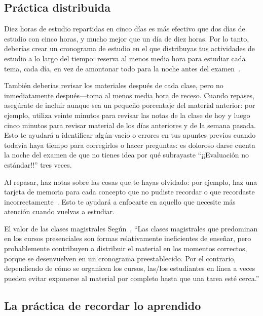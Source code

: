 \subsection*{Práctica distribuida}

Diez horas de estudio repartidas en cinco días
es más efectivo que dos días de estudio con cinco horas,
y mucho mejor que un día de diez horas.
Por lo tanto, deberías crear un cronograma de estudio en el que distribuyas tus actividades de estudio a lo largo del tiempo:
reserva al menos media hora para estudiar cada tema, cada día,
en vez de amontonar todo para la noche antes del examen~\cite{Kang2016}.

También deberías revisar los materiales después de cada clase,
pero no inmediatamente después---toma al menos media hora de receso.
Cuando repases,
asegúrate de incluir aunque sea un pequeño porcentaje del material anterior:
por ejemplo,
utiliza veinte minutos para revisar las notas de la clase de hoy
y luego cinco minutos para revisar material de los días anteriores
y de la semana pasada.
Esto te ayudará a identificar algún vacío o errores en tus apuntes previos
cuando todavía haya tiempo para corregirlos o hacer preguntas:
es doloroso darse cuenta la noche del examen
de que no tienes idea por qué subrayaste ``¡¡Evaluación no estándar!!'' tres veces.

Al repasar,
haz notas sobre las cosas que te hayas olvidado:
por ejemplo,
haz una tarjeta de memoria para cada concepto que no pudiste recordar
o que recordaste incorrectamente~\cite{Matt2019}.
Esto te ayudará a enfocarte en aquello que necesite más atención cuando vuelvas a estudiar.

\begin{aside}{El valor de las clases magistrales}
  Según~\cite{Mill2016a},
  ``Las clases magistrales que predominan en los cursos presenciales son formas relativamente ineficientes de enseñar,
  pero probablemente contribuyen a distribuir el material en los momentos correctos,
  porque se desenvuelven en un cronograma pre\-establecido.
  Por el contrario,
  dependiendo de cómo se organicen los cursos,
  las/los estudiantes en línea a veces pueden evitar exponerse al material por completo hasta que una tarea esté cerca.''
\end{aside}

\subsection*{La práctica de recordar lo aprendido}

